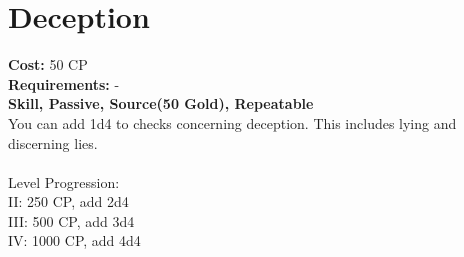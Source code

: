 \section{Deception}
\textbf{Cost:} 50 CP\\
\textbf{Requirements:} -\\
\textbf{Skill, Passive, Source(50 Gold), Repeatable}\\
You can add 1d4 to checks concerning deception. This includes lying and discerning lies.\\
\\
Level Progression:\\
II: 250 CP, add 2d4\\
III: 500 CP, add 3d4\\
IV: 1000 CP, add 4d4\\